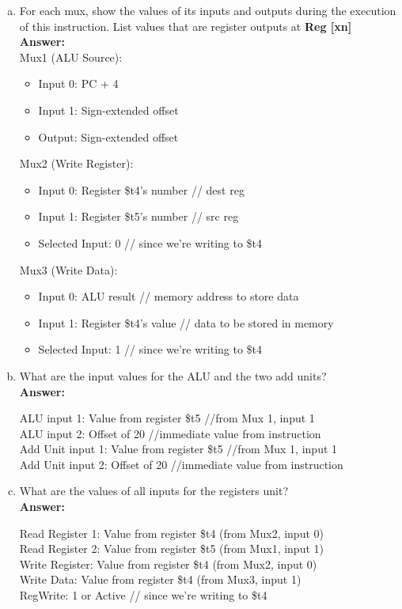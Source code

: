\documentclass[11pt]{article}
\begin{document}
\begin{enumerate}[(a)]
    \item For each mux, show the values of its inputs and outputs during the execution of this instruction. List values that are register outputs at \textbf{Reg [xn]}\\
    \textbf{Answer:}\\[0.15in]
    Mux1 (ALU Source):
    \begin{itemize}
        \item Input 0: PC + 4
        \item Input 1: Sign-extended offset
        \item Output: Sign-extended offset
    \end{itemize}
    Mux2 (Write Register):
    \begin{itemize}
        \item Input 0: Register \$t4's number // dest reg
        \item Input 1: Register \$t5's number // src reg
        \item Selected Input: 0 // since we're writing to \$t4
    \end{itemize}
    Mux3 (Write Data):
    \begin{itemize}
        \item Input 0: ALU result // memory address to store data
        \item Input 1: Register \$t4's value // data to be stored in memory
        \item Selected Input: 1 // since we're writing to \$t4
    \end{itemize}

    \item What are the input values for the ALU and the two add units?\\
    \textbf{Answer:}
    \begin{center}
        ALU input 1: Value from register \$t5 //from Mux 1, input 1\\
        ALU input 2: Offset of 20 //immediate value from instruction\\
        Add Unit input 1: Value from register \$t5 //from Mux 1, input 1\\
        Add Unit input 2: Offset of 20 //immediate value from instruction\\
    \end{center}
    \item What are the values of all inputs for the registers unit?\\
    \textbf{Answer:}
    \begin{center}
        Read Register 1: Value from register \$t4 (from Mux2, input 0)\\
        Read Register 2: Value from register \$t5 (from Mux1, input 1)\\
        Write Register: Value from register \$t4 (from Mux2, input 0)\\
        Write Data: Value from register \$t4 (from Mux3, input 1)\\
        RegWrite: 1 or Active // since we're writing to \$t4\\
    \end{center}
\end{enumerate}
\end{document}
